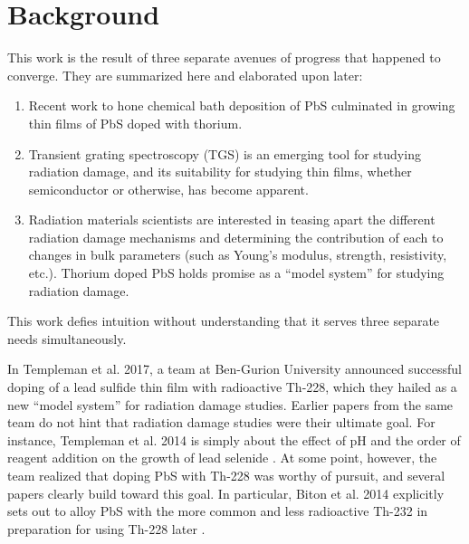 \chapter{Background}
%
This work is the result of three separate avenues of progress that happened to converge. They are summarized here and elaborated upon later:
\begin{enumerate}
	\item Recent work to hone chemical bath deposition of PbS culminated in growing thin films of PbS doped with thorium.\label{first_avenue}
	\item Transient grating spectroscopy (TGS) is an emerging tool for studying radiation damage, and its suitability for studying thin films, whether semiconductor or otherwise, has become apparent.\label{second_avenue}
	\item Radiation materials scientists are interested in teasing apart the different radiation damage mechanisms and determining the contribution of each to changes in bulk parameters (such as Young's modulus, strength, resistivity, etc.). Thorium doped PbS holds promise as a ``model system'' for studying radiation damage.\label{third_avenue}
\end{enumerate}
This work defies intuition without understanding that it serves three separate needs simultaneously. 

In Templeman et al. 2017, a team at Ben-Gurion University announced successful doping of a lead sulfide thin film with radioactive Th-228, which they hailed as a new ``model system'' for radiation damage studies. Earlier papers from the same team do not hint that radiation damage studies were their ultimate goal. For instance, Templeman et al. 2014 is simply about the effect of pH and the order of reagent addition on the growth of lead selenide \cite{Templeman2014}. At some point, however, the team realized that doping PbS with Th-228 was worthy of pursuit, and several papers clearly build toward this goal. In particular, Biton et al. 2014 explicitly sets out to alloy PbS with the more common and less radioactive Th-232 in preparation for using Th-228 later \cite{Biton2014}.

